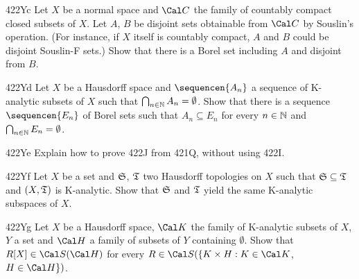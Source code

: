 {\spheader 422Yc Let $X$ be a normal space and $\Cal C$ the family of
countably compact closed subsets of $X$.   Let $A$, $B$ be disjoint sets
obtainable from $\Cal C$ by Souslin's operation.   (For instance, if $X$
itself is countably compact, $A$ and $B$ could be disjoint Souslin-F
sets.)   Show that there is a Borel set including $A$ and disjoint from
$B$.   

\spheader 422Yd Let $X$ be a Hausdorff space and $\sequencen{A_n}$ a
sequence of K-analytic subsets of $X$ such that
$\bigcap_{n\in\Bbb N}A_n=\emptyset$.   Show that there is a sequence
$\sequencen{E_n}$ of
Borel sets such that $A_n\subseteq E_n$ for every $n\in\Bbb N$ and
$\bigcap_{n\in\Bbb N}E_n=\emptyset$.   

\spheader 422Ye Explain how to prove 422J from 421Q, without using 422I.

\spheader 422Yf Let $X$ be a set and $\frak S$, $\frak T$ two Hausdorff
topologies on $X$ such that $\frak S\subseteq\frak T$ and $(X,\frak T)$
is K-analytic.   Show that $\frak S$ and $\frak T$ yield the same
K-analytic subspaces of $X$.

\spheader 422Yg Let $X$ be a Hausdorff space, 
$\Cal K$ the family of K-analytic subsets of $X$, $Y$ a set and $\Cal H$ a
family of subsets of $Y$ containing $\emptyset$.   
Show that $R[X]\in\Cal S(\Cal H)$
for every $R\in\Cal S(\{K\times H:K\in\Cal K$, $H\in\Cal H\})$.
}%

